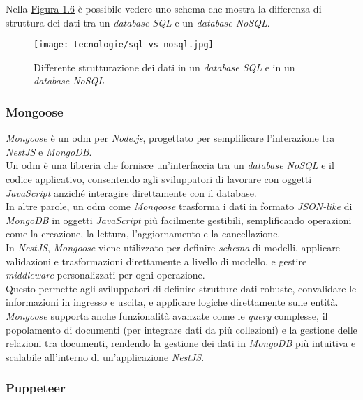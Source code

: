 \noindent Nella {\hyperref[fig:sql-nosql]{Figura 1.6}} è possibile vedere uno schema che mostra la differenza di struttura dei dati tra un \textit{database SQL} e un \textit{database NoSQL}.

\begin{figure}[H]
    \label{fig:sql-nosql}
    \centering
    \texttt{[image: tecnologie/sql-vs-nosql.jpg]}
    \caption{Differente strutturazione dei dati in un \textit{database SQL} e in un \textit{database NoSQL}}
    \cite{site:sql-nosql}
\end{figure}

\pagebreak
\subsubsection{Mongoose}

\textit{Mongoose} è un \gls{odm} per \textit{Node.js}, progettato per semplificare l'interazione tra \textit{NestJS} e \textit{MongoDB}. \\
Un \gls{odm} è una libreria che fornisce un'interfaccia tra un \textit{database NoSQL} e il codice applicativo, consentendo agli sviluppatori di lavorare con oggetti \textit{JavaScript} anziché interagire direttamente con il database. \\
In altre parole, un \gls{odm} come \textit{Mongoose} trasforma i dati in formato \textit{JSON-like} di \textit{MongoDB} in oggetti \textit{JavaScript} più facilmente gestibili, semplificando operazioni come la creazione, la lettura, l'aggiornamento e la cancellazione.\\

\noindent In \textit{NestJS}, \textit{Mongoose} viene utilizzato per definire \textit{schema} di modelli, applicare validazioni e trasformazioni direttamente a livello di modello, e gestire \textit{middleware} personalizzati per ogni operazione.\\
Questo permette agli sviluppatori di definire strutture dati robuste, convalidare le informazioni in ingresso e uscita, e applicare logiche direttamente sulle entità. \\
\textit{Mongoose} supporta anche funzionalità avanzate come le \textit{query} complesse, il popolamento di documenti (per integrare dati da più collezioni) e la gestione delle relazioni tra documenti, rendendo la gestione dei dati in \textit{MongoDB} più intuitiva e scalabile all'interno di un'applicazione \textit{NestJS}.

\subsubsection{Puppeteer}

